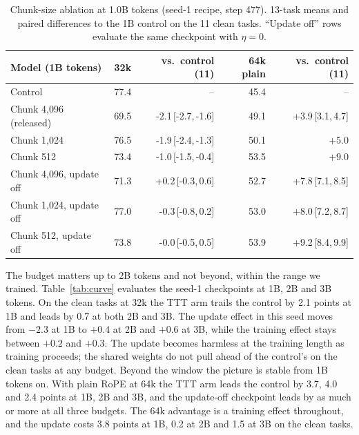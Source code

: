 \documentclass{article}
\newcommand{\ci}[3]{#1\,[#2,\,#3]}
\begin{document}
\begin{table}[t]
\caption{Chunk-size ablation at 1.0B tokens (seed-1 recipe, step 477). 13-task means and paired differences to the 1B control on the 11 clean tasks. ``Update off'' rows evaluate the same checkpoint with $\eta = 0$.}
\label{tab:chunk}
\centering
\footnotesize
\begin{tabular}{lrrrr}
\toprule
Model (1B tokens) & 32k & vs.\ control (11) & 64k plain & vs.\ control (11) \\
\midrule
Control & 77.4 & -- & 45.4 & -- \\
Chunk 4,096 (released) & 69.5 & \ci{-2.1}{-2.7}{-1.6} & 49.1 & \ci{+3.9}{3.1}{4.7} \\
Chunk 1,024 & 76.5 & \ci{-1.9}{-2.4}{-1.3} & 50.1 & $+5.0$ \\
Chunk 512 & 73.4 & \ci{-1.0}{-1.5}{-0.4} & 53.5 & $+9.0$ \\
\midrule
Chunk 4,096, update off & 71.3 & \ci{+0.2}{-0.3}{0.6} & 52.7 & \ci{+7.8}{7.1}{8.5} \\
Chunk 1,024, update off & 77.0 & \ci{-0.3}{-0.8}{0.2} & 53.0 & \ci{+8.0}{7.2}{8.7} \\
Chunk 512, update off & 73.8 & \ci{-0.0}{-0.5}{0.5} & 53.9 & \ci{+9.2}{8.4}{9.9} \\
\bottomrule
\end{tabular}
\end{table}

The budget matters up to 2B tokens and not beyond, within the range we trained. Table~\ref{tab:curve} evaluates the seed-1 checkpoints at 1B, 2B and 3B tokens. On the clean tasks at 32k the TTT arm trails the control by 2.1 points at 1B and leads by 0.7 at both 2B and 3B. The update effect in this seed moves from $-2.3$ at 1B to $+0.4$ at 2B and $+0.6$ at 3B, while the training effect stays between $+0.2$ and $+0.3$. The update becomes harmless at the training length as training proceeds; the shared weights do not pull ahead of the control's on the clean tasks at any budget. Beyond the window the picture is stable from 1B tokens on. With plain RoPE at 64k the TTT arm leads the control by 3.7, 4.0 and 2.4 points at 1B, 2B and 3B, and the update-off checkpoint leads by as much or more at all three budgets. The 64k advantage is a training effect throughout, and the update costs 3.8 points at 1B, 0.2 at 2B and 1.5 at 3B on the clean tasks.
\end{document}
